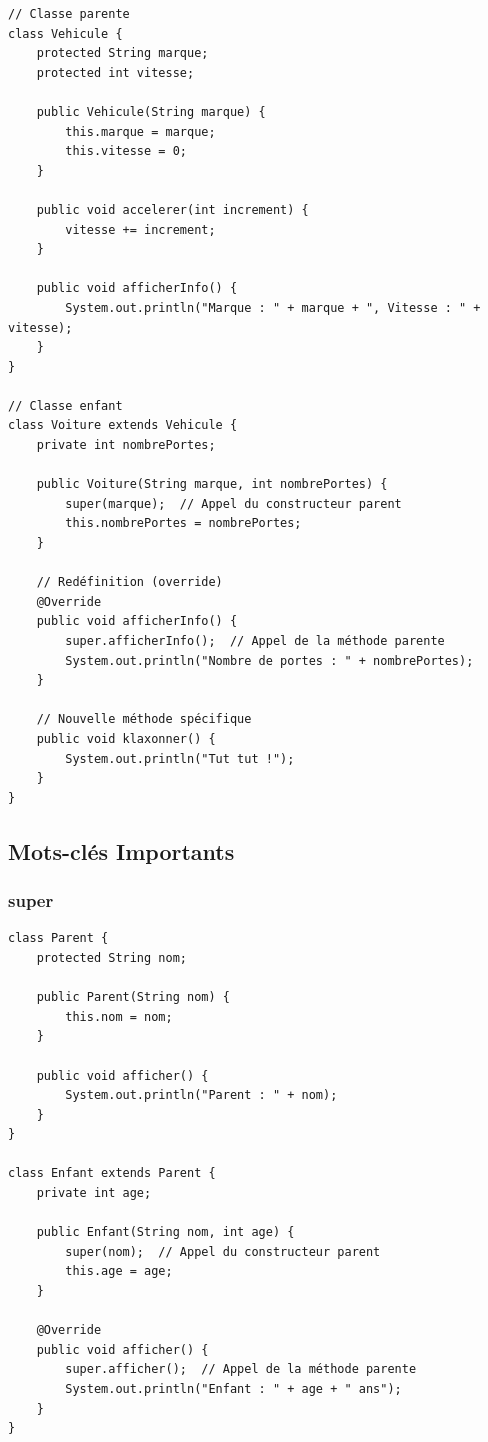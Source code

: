 \documentclass[11pt,a4paper]{article}
\begin{document}
\begin{lstlisting}
// Classe parente
class Vehicule {
    protected String marque;
    protected int vitesse;
    
    public Vehicule(String marque) {
        this.marque = marque;
        this.vitesse = 0;
    }
    
    public void accelerer(int increment) {
        vitesse += increment;
    }
    
    public void afficherInfo() {
        System.out.println("Marque : " + marque + ", Vitesse : " + vitesse);
    }
}

// Classe enfant
class Voiture extends Vehicule {
    private int nombrePortes;
    
    public Voiture(String marque, int nombrePortes) {
        super(marque);  // Appel du constructeur parent
        this.nombrePortes = nombrePortes;
    }
    
    // Redéfinition (override)
    @Override
    public void afficherInfo() {
        super.afficherInfo();  // Appel de la méthode parente
        System.out.println("Nombre de portes : " + nombrePortes);
    }
    
    // Nouvelle méthode spécifique
    public void klaxonner() {
        System.out.println("Tut tut !");
    }
}
\end{lstlisting}

\subsection{Mots-clés Importants}

\subsubsection{super}

\begin{lstlisting}
class Parent {
    protected String nom;
    
    public Parent(String nom) {
        this.nom = nom;
    }
    
    public void afficher() {
        System.out.println("Parent : " + nom);
    }
}

class Enfant extends Parent {
    private int age;
    
    public Enfant(String nom, int age) {
        super(nom);  // Appel du constructeur parent
        this.age = age;
    }
    
    @Override
    public void afficher() {
        super.afficher();  // Appel de la méthode parente
        System.out.println("Enfant : " + age + " ans");
    }
}
\end{lstlisting}
\end{document}

